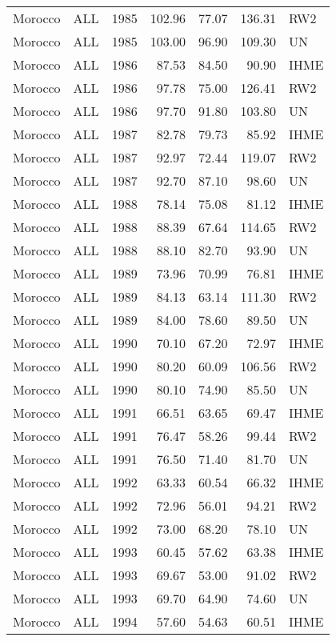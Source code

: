 \begin{longtable}{lllrrrl}
  Morocco & ALL & 1985 & 102.96 & 77.07 & 136.31 & RW2 \\ 
  Morocco & ALL & 1985 & 103.00 & 96.90 & 109.30 & UN \\ 
  Morocco & ALL & 1986 & 87.53 & 84.50 & 90.90 & IHME \\ 
  Morocco & ALL & 1986 & 97.78 & 75.00 & 126.41 & RW2 \\ 
  Morocco & ALL & 1986 & 97.70 & 91.80 & 103.80 & UN \\ 
  Morocco & ALL & 1987 & 82.78 & 79.73 & 85.92 & IHME \\ 
  Morocco & ALL & 1987 & 92.97 & 72.44 & 119.07 & RW2 \\ 
  Morocco & ALL & 1987 & 92.70 & 87.10 & 98.60 & UN \\ 
  Morocco & ALL & 1988 & 78.14 & 75.08 & 81.12 & IHME \\ 
  Morocco & ALL & 1988 & 88.39 & 67.64 & 114.65 & RW2 \\ 
  Morocco & ALL & 1988 & 88.10 & 82.70 & 93.90 & UN \\ 
  Morocco & ALL & 1989 & 73.96 & 70.99 & 76.81 & IHME \\ 
  Morocco & ALL & 1989 & 84.13 & 63.14 & 111.30 & RW2 \\ 
  Morocco & ALL & 1989 & 84.00 & 78.60 & 89.50 & UN \\ 
  Morocco & ALL & 1990 & 70.10 & 67.20 & 72.97 & IHME \\ 
  Morocco & ALL & 1990 & 80.20 & 60.09 & 106.56 & RW2 \\ 
  Morocco & ALL & 1990 & 80.10 & 74.90 & 85.50 & UN \\ 
  Morocco & ALL & 1991 & 66.51 & 63.65 & 69.47 & IHME \\ 
  Morocco & ALL & 1991 & 76.47 & 58.26 & 99.44 & RW2 \\ 
  Morocco & ALL & 1991 & 76.50 & 71.40 & 81.70 & UN \\ 
  Morocco & ALL & 1992 & 63.33 & 60.54 & 66.32 & IHME \\ 
  Morocco & ALL & 1992 & 72.96 & 56.01 & 94.21 & RW2 \\ 
  Morocco & ALL & 1992 & 73.00 & 68.20 & 78.10 & UN \\ 
  Morocco & ALL & 1993 & 60.45 & 57.62 & 63.38 & IHME \\ 
  Morocco & ALL & 1993 & 69.67 & 53.00 & 91.02 & RW2 \\ 
  Morocco & ALL & 1993 & 69.70 & 64.90 & 74.60 & UN \\ 
  Morocco & ALL & 1994 & 57.60 & 54.63 & 60.51 & IHME \\ 

\end{longtable}
